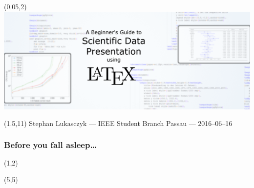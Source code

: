 \documentclass[t]{beamer}
\begin{document}
\begin{frame}[plain,label=titel]
  \begin{textblock}{0}(0.05,2)
    \includegraphics{banner}
  \end{textblock}
  \begin{textblock}{20}(1.5,11)
    \small Stephan Lukasczyk — IEEE Student Branch Passau — 2016--06--16
  \end{textblock}
\end{frame}

\begin{frame}
  \frametitle{Before you fall asleep\dots}
  \begin{textblock}{0}(1,2)
  \end{textblock}

  \begin{textblock}{0}(5,5)
  \end{textblock}
\end{frame}
\end{document}
